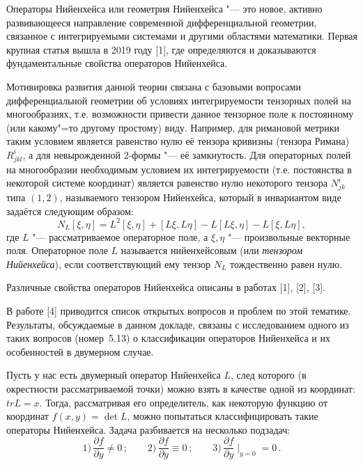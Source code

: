 
\vzmscaption

Операторы Нийенхейса или геометрия Нийенхейса "--- это новое, активно развивающееся направление современной дифференциальной геометрии, связанное с интегрируемыми системами и другими областями математики.
Первая крупная статья вышла в 2019 году [1], где определяются и доказываются фундаментальные свойства операторов Нийенхейса.

Мотивировка развития данной теории связана с базовыми вопросами дифференциальной геометрии об условиях интегрируемости тензорных полей на многообразиях, т.е. возможности привести данное
тензорное поле к постоянному (или какому"=то другому простому) виду. Например, для римановой метрики таким условием является равенство нулю её тензора кривизны (тензора Римана) $R^i_{jkl}$,
а для невырожденной 2-формы "--- её замкнутость. Для операторных полей на многообразии необходимым условием их интегрируемости (т.е. постоянства в некоторой системе координат) является
равенство нулю некоторого тензора $N^i_{jk}$ типа $(1,2)$, называемого тензором Нийенхейса, который в инвариантом виде задаётся следующим образом:
\begin{equation*}
N_L [\xi, \eta] = L^2[\xi, \eta] + [L \xi, L \eta] - L[L \xi, \eta] - L[\xi, L \eta],
\end{equation*}
где $L$ "--- рассматриваемое операторное поле, а $\xi,\eta$ "--- произвольные векторные поля. Операторное поле $L$ называется нийенхейсовым (или \textit{тензором Нийенхейса}), если
соответствующий ему тензор $N_L$ тождественно равен нулю.

Различные свойства операторов Нийенхейса описаны в работах [1], [2], [3].

В работе [4] приводится список открытых вопросов и проблем по этой тематике. Результаты, обсуждаемые в данном докладе, связаны с исследованием одного из таких вопросов (номер~5.13)
о классификации операторов Нийенхейса и их особенностей в двумерном случае.

Пусть у нас есть двумерный оператор Нийенхейса $L$, след которого (в окрестности рассматриваемой точки) можно взять в качестве одной из координат: $tr L = x$.
Тогда, рассматривая его определитель, как некоторую функцию от координат $f(x,y)=\det L$, можно попытаться классифицировать такие операторы Нийенхейса.
Задача разбивается на несколько подзадач:
%
$$
1)\,\frac{\partial f}{\partial y} \neq 0    \,;\qquad
2)\,\frac{\partial f}{\partial y} \equiv 0  \,;\qquad
3)\,\frac{\partial f}{\partial y} \mid_{y = 0} = 0\,.
$$

